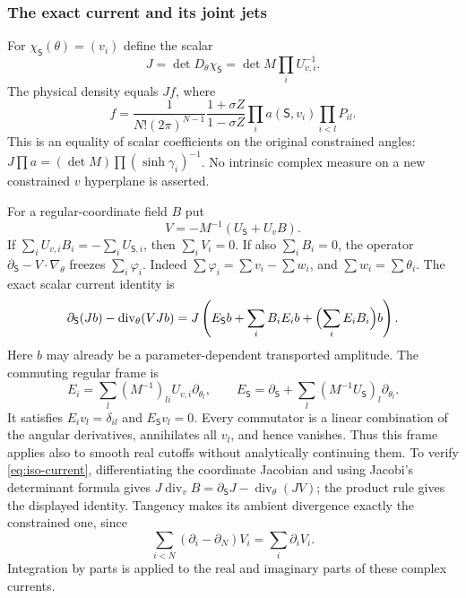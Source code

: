\documentclass[11pt]{article}
\numberwithin{equation}{section}
\theoremstyle{definition}
\begin{document}
\subsubsection{The exact current and its joint jets}

For $\chi_{\mathsf S}(\theta)=(v_i)$ define the scalar
\[
 J=\det D_\theta\chi_{\mathsf S}
    =\det M\prod_i U_{v,i}^{-1}.
\]
The physical density equals $Jf$, where
\begin{equation}\label{eq:iso-regular-density}
 f=\frac1{N!(2\pi)^{N-1}}
       \frac{1+\sigma Z}{1-\sigma Z}
       \prod_i a(\mathsf S,v_i)\prod_{i<l}P_{il}.
\end{equation}
This is an equality of scalar coefficients on the original constrained
angles: $J\prod a=(\det M)\prod(\sinh\gamma_i)^{-1}$.
No intrinsic complex measure on a new constrained $v$ hyperplane is
asserted.

For a regular-coordinate field $B$ put
\begin{equation}\label{eq:iso-angular-field}
 V=-M^{-1}(U_{\mathsf S}+U_vB).
\end{equation}
If $\sum_iU_{v,i}B_i=-\sum_iU_{\mathsf S,i}$, then $\sum_iV_i=0$.
If also $\sum_iB_i=0$, the operator
$\partial_{\mathsf S}-V\cdot\nabla_\theta$ freezes $\sum_i\varphi_i$.
Indeed $\sum\varphi_i=\sum v_i-\sum w_i$, and $\sum w_i=\sum\theta_i$.
The exact scalar current identity is
\begin{equation}\label{eq:iso-current}
 \partial_{\mathsf S}(Jb)-\operatorname{div}_\theta(VJb)
  =J\left(E_{\mathsf S}b+\sum_i B_iE_i b
                           +\Bigl(\sum_iE_iB_i\Bigr)b\right).
\end{equation}
Here $b$ may already be a parameter-dependent transported amplitude.
The commuting regular frame is
\[
 E_i=\sum_l(M^{-1})_{li}U_{v,i}\partial_{\theta_l},\qquad
 E_{\mathsf S}=\partial_{\mathsf S}
                  +\sum_l(M^{-1}U_{\mathsf S})_l\partial_{\theta_l}.
\]
It satisfies $E_i v_l=\delta_{il}$ and $E_{\mathsf S}v_l=0$.
Every commutator is a linear combination of the angular derivatives,
annihilates all $v_l$, and hence vanishes.  Thus this frame applies
also to smooth real cutoffs without analytically continuing them.
To verify \eqref{eq:iso-current}, differentiating the coordinate
Jacobian and using Jacobi's determinant formula gives
$J\operatorname{div}_vB=\partial_{\mathsf S}J-\operatorname{div}_\theta(JV)$;
the product rule gives the displayed identity.  Tangency makes its
ambient divergence exactly the constrained one, since
\[
 \sum_{i<N}(\partial_i-\partial_N)V_i=\sum_i\partial_iV_i.
\]
Integration by parts is applied to the real and imaginary parts of
these complex currents.
\end{document}
